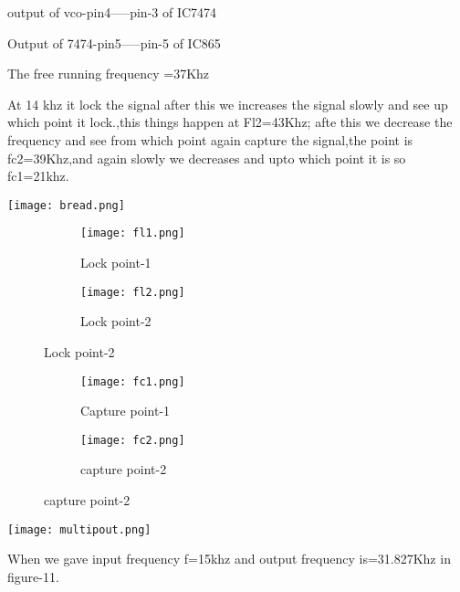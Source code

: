 \documentclass{article}
\begin{document}
output of vco-pin4-----pin-3 of IC7474\par
Output of 7474-pin5-----pin-5 of IC865\par


The free running frequency =37Khz \par
At 14 khz it lock the signal after this we increases the signal slowly and see up which point  it lock.,this things happen at Fl2=43Khz;
afte this we decrease the frequency and see from which point again capture the signal,the point is fc2=39Khz,and again slowly we decreases and upto which point it is so fc1=21khz.\par 


\begin{figure*}[ht]
	\centering
	\texttt{[image: bread.png]}
	\caption{Circuit on Breadboard}
	\label{FBD}
\end{figure*}




\begin{figure}[h]
  \begin{subfigure}[b]{0.5\textwidth}
    \texttt{[image: fl1.png]}
    \caption{Lock point-1}
    \label{fig:1}
  \end{subfigure}
  \begin{subfigure}[b]{0.5\textwidth}
    \texttt{[image: fl2.png]}
    \caption{Lock point-2}
    \label{fig:2}
  \end{subfigure}
\end{figure}



\begin{figure}[ht]
  \begin{subfigure}[b]{0.5\textwidth}
    \texttt{[image: fc1.png]}
    \caption{ Capture point-1}
    \label{fig:1}
  \end{subfigure}
  \begin{subfigure}[b]{0.5\textwidth}
    \texttt{[image: fc2.png]}
    \caption{capture point-2}
    \label{fig:2}
  \end{subfigure}
\end{figure}






\begin{figure*}[ht]
	\centering
	\texttt{[image: multipout.png]}
	\caption{Frequency Multiplied By 2}
	\label{FBD}
\end{figure*}
\par
\par 
When we gave input frequency f=15khz and output frequency is=31.827Khz in figure-11.
\end{document}
